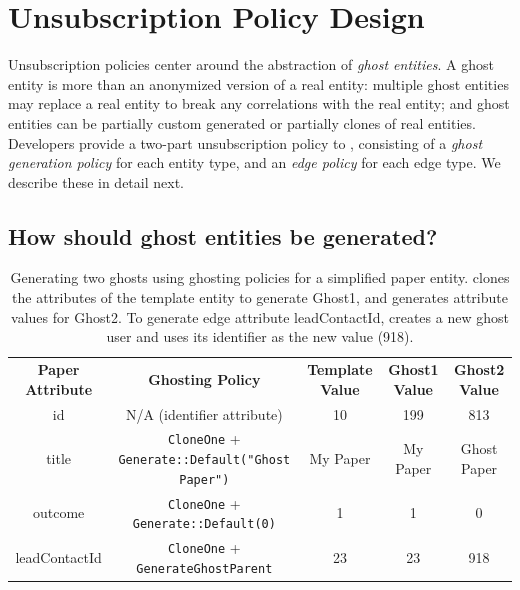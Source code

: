 \section{Unsubscription Policy Design}
\label{sec:design:unsub}
Unsubscription policies center around the abstraction of \emph{ghost entities}. A ghost entity is
more than an anonymized version of a real entity: multiple ghost
entities may replace a real entity to break any correlations with the real entity; and ghost entities can be
partially custom generated or partially clones of real entities.
Developers provide a two-part unsubscription policy to \sys, consisting of a \emph{ghost
generation policy} for each entity type, and an \emph{edge policy} for each edge type. We
describe these in detail next.

\subsection{How should ghost entities be generated?}
\label{sec:ghosting}

\begin{table}[t!]
    \centering
    \footnotesize
\begin{tabular}{@{}ccccc@{}}
\textbf{Paper Attribute} & \textbf{Ghosting Policy} & \textbf{Template Value} & \textbf{Ghost1 Value} & \textbf{Ghost2 Value} 
  \\ \cmidrule(r){1-5}
    {id} & N/A (identifier attribute) & 10 & 199 & 813 \\
{title} & \texttt{CloneOne} + \texttt{Generate::Default("Ghost Paper")} & My Paper & My
    Paper & Ghost Paper \\
{outcome} & \texttt{CloneOne} + \texttt{Generate::Default(0)} & 1 & 1 & 0 \\
{leadContactId} & \texttt{CloneOne} + \texttt{GenerateGhostParent} & 23 & 23 & 918 \\
\end{tabular}
    \caption{Generating two ghosts using ghosting policies for a simplified paper entity.
    \sys clones the attributes of the template entity to generate Ghost1, and generates
    attribute values for Ghost2. To generate edge attribute leadContactId, \sys creates a new ghost user and uses its identifier as the new value (918).}
    \label{tab:ghosting}
\end{table}

